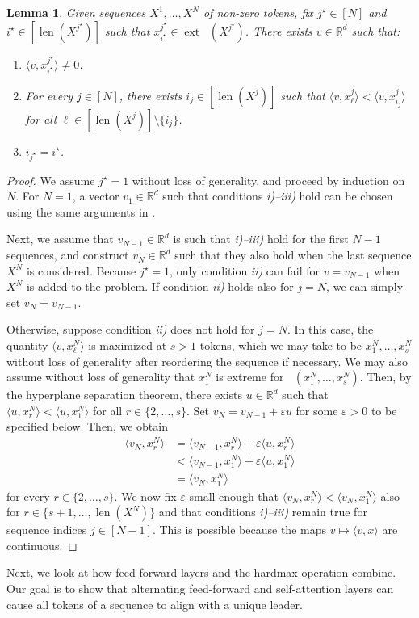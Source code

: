 \documentclass[pdflatex,sn-mathphys-num]{sn-jnl}%
\theoremstyle{thmstyleone}%
\newtheorem{lemma}[theorem]{Lemma}
\theoremstyle{thmstyletwo}%
\theoremstyle{thmstylethree}%
\numberwithin{equation}{section}
\newcommand{\R}{\mathbb{R}}
\DeclareMathOperator{\co}{\overline{co}}
\DeclareMathOperator{\ext}{ext}
\newcommand{\ip}[2]{\langle #1, #2 \rangle}
\DeclareMathOperator{\len}{len}
\begin{document}
\begin{lemma}\label{lem:auxLemmaSingleLeader}
Given sequences $X^1, \dots, X^N$ of non-zero tokens, fix $j^\star\in [N]$ and $i^\star\in [\len (X^{j^\star})]$ such that $x_{i^\star}^{j^\star} \in \ext\co(X^{j^\star})$. There exists $v\in \R^d$ such that:
\begin{enumerate}%
    \item[i)] $\ip{v}{x_{i^\star}^{j^\star}} \neq 0$.
    \item[ii)] 
    For every $j \in [N]$, there exists $i_j\in [\len (X^j)]$ such that $\ip{v}{x_\ell^j} < \ip{v}{x_{i_j}^j}$ for all $\ell \in [\len (X^j)] \setminus \{i_j\}$.
    \item[iii)] $i_{j^\star} = i^\star$.
\end{enumerate}
\end{lemma}
\begin{proof}
We assume $j^\star = 1$ without loss of generality, and proceed by induction on $N$. For $N=1$, a vector $v_1\in \R^d$ such that conditions \textit{i)--iii)} hold can be chosen using the same arguments in . 

Next, we assume that $v_{N-1}\in \R^d$ is such that \textit{i)--iii)} hold for the first $N-1$ sequences, and construct $v_{N}\in \R^d$ such that they also hold when the last sequence $X^N$ is considered. Because $j^\star = 1$, only condition \textit{ii)} can fail for $v = v_{N-1}$ when $X^N$ is added to the problem. If condition \textit{ii)} holds also for $j=N$, we can simply set $v_{N} = v_{N-1}$.

Otherwise, suppose condition \textit{ii)} does not hold for $j=N$. In this case, the quantity $\ip{v}{x_\ell^{N}}$ is maximized at $s>1$ tokens, which we may take to be $x_1^{N}, \dots, x_s^{N}$ without loss of generality after reordering the sequence if necessary. We may also assume without loss of generality that $x_1^{N}$ is extreme for $\co(x_1^{N}, \dots, x_s^{N})$. Then, by the hyperplane separation theorem, there exists $u\in\R^d$ such that $\ip{u}{x_r^{N}} < \ip{u}{x_1^{N}}$ for all $r \in \{2,\dots,s\}$.
Set $v_{N} = v_{N-1} + \varepsilon u$ for some $\varepsilon>0$ to be specified below. Then, we obtain
\begin{equation*}
\begin{aligned}
    \ip{v_{N}}{x_r^{N}} &= \ip{v_{N-1}}{x_r^{N}} + \varepsilon \ip{u}{x_r^{N}}  \\
    &< \ip{v_{N-1}}{x_1^{N}} + \varepsilon \ip{u}{x_1^{N}}  \\
    &= \ip{v_{N}}{x_1^{N}}
\end{aligned}
\end{equation*}
for every $r \in \{2,\dots, s\}$.
We now fix $\varepsilon$ small enough that $\ip{v_{N}}{x_r^{N}} < \ip{v_{N}}{x_1^{N}}$ also for $r\in\{s+1,\ldots,\len(X^N)\}$ and that conditions \textit{i)--iii)} remain true for sequence indices $j\in[N-1]$. This is possible because the maps $v\mapsto \ip{v}{x}$ are continuous.
\end{proof}
%
Next, we look at how feed-forward layers and the hardmax operation combine. Our goal is to show that alternating feed-forward and self-attention layers can cause all tokens of a sequence to align with a unique leader.
\end{document}
